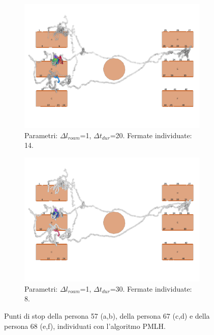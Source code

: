 \documentclass[12pt]{article}
\begin{document}
\begin{figure}[htb!]
    \hfill
    \begin{subfigure}[b]{0.45\textwidth}
        \centering
        \includegraphics[width=\textwidth]{images/stop_points_p68_PMLH_r1_s20.png}
        \caption{Parametri: $\Delta l_{roam}$=1, $\Delta t_{dur}$=20. Fermate individuate: 14.}
        \label{stop_points_p68_PMLH_r1_s20}
    \end{subfigure}
    \hfill
    \begin{subfigure}[b]{0.45\textwidth}
        \centering
        \includegraphics[width=\textwidth]{images/stop_points_p68_PMLH_r1_s30.png}
        \caption{Parametri: $\Delta l_{roam}$=1, $\Delta t_{dur}$=30. Fermate individuate: 8.}
        \label{stop_points_p68_PMLH_r1_s30}
    \end{subfigure}
    \hfill
    \caption{Punti di stop della persona 57 (a,b), della persona 67 (c,d) e della persona 68 (e,f), individuati con l'algoritmo PMLH.}
    \label{stop_points_PMLH}
\end{figure}
\end{document}
